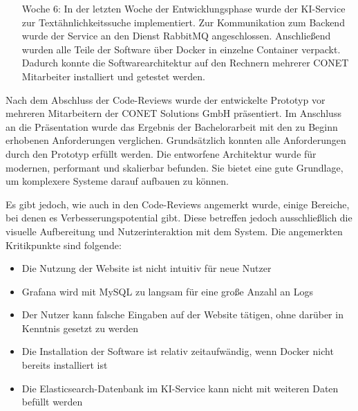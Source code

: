\begin{itemize}[leftmargin=6em]
\item [Woche 6:] In der letzten Woche der Entwicklungsphase wurde der KI-Service zur Textähnlichkeitssuche implementiert. Zur Kommunikation zum Backend wurde der Service an den Dienst RabbitMQ angeschlossen. Anschließend wurden alle Teile der Software über Docker in einzelne Container verpackt. Dadurch konnte die Softwarearchitektur auf den Rechnern mehrerer CONET Mitarbeiter installiert und getestet werden.
\end{itemize}

Nach dem Abschluss der Code-Reviews wurde der entwickelte Prototyp vor mehreren Mitarbeitern der CONET Solutions GmbH präsentiert. Im Anschluss an die Präsentation wurde das Ergebnis der Bachelorarbeit mit den zu Beginn erhobenen Anforderungen verglichen. Grundsätzlich konnten alle Anforderungen durch den Prototyp erfüllt werden. Die entworfene Architektur wurde für modernen, performant und skalierbar befunden. Sie bietet eine gute Grundlage, um komplexere Systeme darauf aufbauen zu können.

Es gibt jedoch, wie auch in den Code-Reviews angemerkt wurde, einige Bereiche, bei denen es Verbesserungspotential gibt. Diese betreffen jedoch ausschließlich die visuelle Aufbereitung und Nutzerinteraktion mit dem System. Die angemerkten Kritikpunkte sind folgende:

\begin{itemize}
\item Die Nutzung der Website ist nicht intuitiv für neue Nutzer
\item Grafana wird mit MySQL zu langsam für eine große Anzahl an Logs
\item Der Nutzer kann falsche Eingaben auf der Website tätigen, ohne darüber in Kenntnis gesetzt zu werden
\item Die Installation der Software ist relativ zeitaufwändig, wenn Docker nicht bereits installiert ist
\item Die Elasticsearch-Datenbank im KI-Service kann nicht mit weiteren Daten befüllt werden
\end{itemize}
  